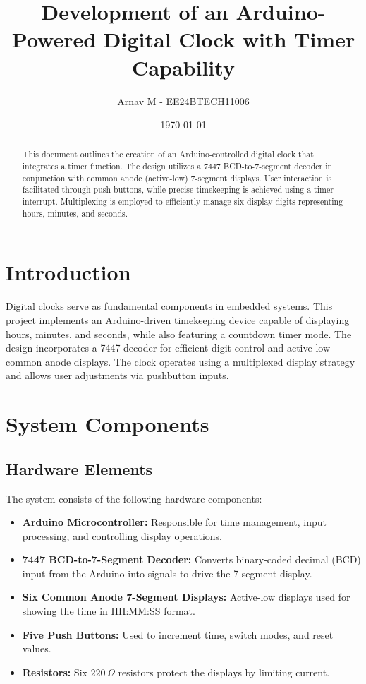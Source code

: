 \documentclass[a4paper,12pt]{article}
\title{Development of an Arduino-Powered Digital Clock with Timer Capability}
\author{Arnav M - EE24BTECH11006}
\date{\today}
\begin{document}
\maketitle

\begin{abstract}
This document outlines the creation of an Arduino-controlled digital clock that integrates a timer function. The design utilizes a 7447 BCD-to-7-segment decoder in conjunction with common anode (active-low) 7-segment displays. User interaction is facilitated through push buttons, while precise timekeeping is achieved using a timer interrupt. Multiplexing is employed to efficiently manage six display digits representing hours, minutes, and seconds.
\end{abstract}

\section{Introduction}
Digital clocks serve as fundamental components in embedded systems. This project implements an Arduino-driven timekeeping device capable of displaying hours, minutes, and seconds, while also featuring a countdown timer mode. The design incorporates a 7447 decoder for efficient digit control and active-low common anode displays. The clock operates using a multiplexed display strategy and allows user adjustments via pushbutton inputs.

\section{System Components}
\subsection{Hardware Elements}
The system consists of the following hardware components:
\begin{itemize}
    \item \textbf{Arduino Microcontroller:} Responsible for time management, input processing, and controlling display operations.
    \item \textbf{7447 BCD-to-7-Segment Decoder:} Converts binary-coded decimal (BCD) input from the Arduino into signals to drive the 7-segment display.
    \item \textbf{Six Common Anode 7-Segment Displays:} Active-low displays used for showing the time in HH:MM:SS format.
    \item \textbf{Five Push Buttons:} Used to increment time, switch modes, and reset values.
    \item \textbf{Resistors:} Six $220\,\Omega$ resistors protect the displays by limiting current.
\end{itemize}
\end{document}
